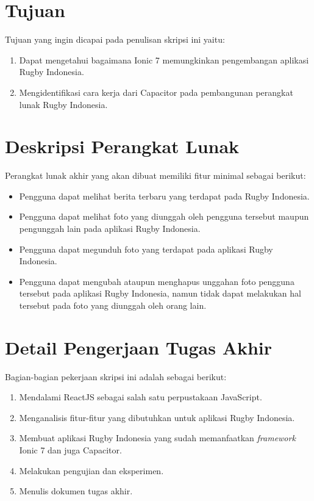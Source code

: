 \documentclass[a4paper,twoside]{article}
\begin{document}
\section{Tujuan}
Tujuan yang ingin dicapai pada penulisan skripsi ini yaitu:
\begin{enumerate}
    \item Dapat mengetahui bagaimana Ionic 7 memungkinkan pengembangan aplikasi Rugby Indonesia.
    \item Mengidentifikasi cara kerja dari Capacitor pada pembangunan perangkat lunak Rugby Indonesia.
\end{enumerate}

\section{Deskripsi Perangkat Lunak}

Perangkat lunak akhir yang akan dibuat memiliki fitur minimal sebagai berikut:
\begin{itemize}
    \item Pengguna dapat melihat berita terbaru yang terdapat pada Rugby Indonesia.
    \item Pengguna dapat melihat foto yang diunggah oleh pengguna tersebut maupun pengunggah lain pada aplikasi Rugby Indonesia.
    \item Pengguna dapat megunduh foto yang terdapat pada aplikasi Rugby Indonesia.
    \item Pengguna dapat mengubah ataupun menghapus unggahan foto pengguna tersebut pada aplikasi Rugby Indonesia, namun tidak dapat melakukan hal tersebut pada foto yang diunggah oleh orang lain.
\end{itemize}

\section{Detail Pengerjaan Tugas Akhir}
Bagian-bagian pekerjaan skripsi ini adalah sebagai berikut:
\begin{enumerate}
    \item Mendalami ReactJS sebagai salah satu perpustakaan JavaScript.
    \item Menganalisis fitur-fitur yang dibutuhkan untuk aplikasi Rugby Indonesia.
    \item Membuat aplikasi Rugby Indonesia yang sudah memanfaatkan \textit{framework} Ionic 7 dan juga Capacitor.
    \item Melakukan pengujian dan eksperimen.
    \item Menulis dokumen tugas akhir.
\end{enumerate}
\end{document}

